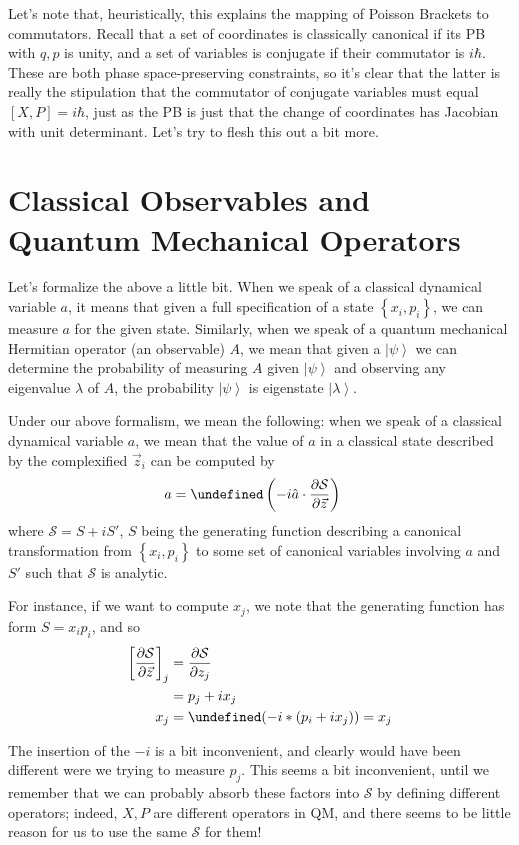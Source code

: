 \documentclass[12pt]{report}
\newcommand*{\pd}[2]{\frac{\partial#1}{\partial#2}}
\newcommand*{\ket}[1]{\left|#1\right>}
\let\Re\undefined
\DeclareMathOperator{\Re}{Re}
\begin{document}
Let's note that, heuristically, this explains the mapping of Poisson Brackets
to commutators. Recall that a set of coordinates is classically canonical if its
PB with $q,p$ is unity, and a set of variables is conjugate if their commutator
is $i\hbar$. These are both phase space-preserving constraints, so it's clear
that the latter is really the stipulation that the commutator of conjugate
variables must equal $\left[ X,P \right] = i\hbar$, just as the PB is just that
the change of coordinates has Jacobian with unit determinant. Let's try to flesh
this out a bit more.

\section{Classical Observables and Quantum Mechanical Operators}

Let's formalize the above a little bit. When we speak of a classical dynamical
variable $a$, it means that given a full specification of a state $\left\{ x_i,
p_i\right\}$, we can measure $a$ for the given state. Similarly, when we speak
of a quantum mechanical Hermitian operator (an observable) $A$, we mean that
given a $\ket{\psi}$ we can determine the probability of measuring $A$ given
$\ket{\psi}$ and observing any eigenvalue $\lambda$ of $A$, the probability
$\ket{\psi}$ is eigenstate $\ket{\lambda}$.

Under our above formalism, we mean the following: when we speak of a classical
dynamical variable $a$, we mean that the value of $a$ in a classical state
described by the complexified $\vec{z}_i$ can be computed by
\begin{align}
    a &= \Re\left(-i\hat{a}\cdot \pd{\mathcal{S}}{\vec{z}}\right)
\end{align}
where $\mathcal{S} = S + iS'$, $S$ being the generating function describing a
canonical transformation from $\left\{ x_i, p_i \right\}$ to some set of
canonical variables involving $a$ and $S'$ such that $\mathcal{S}$ is analytic.

For instance, if we want to compute $x_j$, we note that the generating function
has form $S = x_ip_i$, and so
\begin{align}
    \left[ \pd{\mathcal{S}}{\vec{z}} \right]_j &= \pd{\mathcal{S}}{z_j}\\
    &= p_j + ix_j\\
    x_j &= \Re(-i * (p_i + ix_j)) = x_j
\end{align}

The insertion of the $-i$ is a bit inconvenient, and clearly would have been
different were we trying to measure $p_j$. This seems a bit inconvenient, until
we remember that we can probably absorb these factors into $\mathcal{S}$ by
defining different operators; indeed, $X,P$ are different operators in QM, and
there seems to be little reason for us to use the same $\mathcal{S}$ for them!
\end{document}
